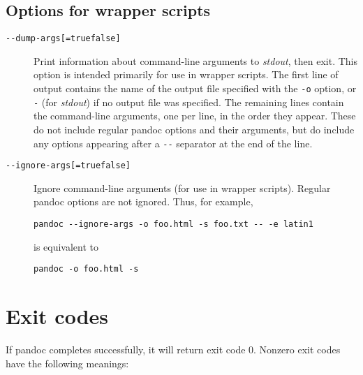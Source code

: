 \documentclass[
  a4paper,
]{article}
\begin{document}
\hypertarget{options-for-wrapper-scripts}{%
\subsection{Options for wrapper
scripts}\label{options-for-wrapper-scripts}}

\begin{description}
\item[\texttt{-\/-dump-args{[}=true\textbar{}false{]}}]
Print information about command-line arguments to \emph{stdout}, then
exit. This option is intended primarily for use in wrapper scripts. The
first line of output contains the name of the output file specified with
the \texttt{-o} option, or \texttt{-} (for \emph{stdout}) if no output
file was specified. The remaining lines contain the command-line
arguments, one per line, in the order they appear. These do not include
regular pandoc options and their arguments, but do include any options
appearing after a \texttt{-\/-} separator at the end of the line.
\item[\texttt{-\/-ignore-args{[}=true\textbar{}false{]}}]
Ignore command-line arguments (for use in wrapper scripts). Regular
pandoc options are not ignored. Thus, for example,

\begin{verbatim}
pandoc --ignore-args -o foo.html -s foo.txt -- -e latin1
\end{verbatim}

is equivalent to

\begin{verbatim}
pandoc -o foo.html -s
\end{verbatim}
\end{description}

\hypertarget{exit-codes}{%
\section{Exit codes}\label{exit-codes}}

If pandoc completes successfully, it will return exit code 0. Nonzero
exit codes have the following meanings:
\end{document}
